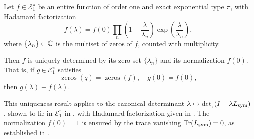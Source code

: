 \begin{lemma}
\label{lem:hadamard_uniqueness_E1pi}
Let \( f \in \mathcal{E}_1^\pi \) be an entire function of order one and exact exponential type \( \pi \), with Hadamard factorization
\[
f(\lambda) = f(0) \prod_n \left( 1 - \frac{\lambda}{\lambda_n} \right) \exp\left( \frac{\lambda}{\lambda_n} \right),
\]
where \( \{ \lambda_n \} \subset \mathbb{C} \) is the multiset of zeros of \( f \), counted with multiplicity.

Then \( f \) is uniquely determined by its zero set \( \{ \lambda_n \} \) and its normalization \( f(0) \). That is, if \( g \in \mathcal{E}_1^\pi \) satisfies
\[
\operatorname{zeros}(g) = \operatorname{zeros}(f), \quad g(0) = f(0),
\]
then \( g(\lambda) \equiv f(\lambda) \).

\medskip
\noindent
This uniqueness result applies to the canonical determinant \( \lambda \mapsto \det\nolimits_{\zeta}(I - \lambda L_{\mathrm{sym}}) \), shown to lie in \( \mathcal{E}_1^\pi \) in , with Hadamard factorization given in . The normalization \( f(0) = 1 \) is ensured by the trace vanishing \( \operatorname{Tr}(L_{\mathrm{sym}}) = 0 \), as established in .
\end{lemma}
